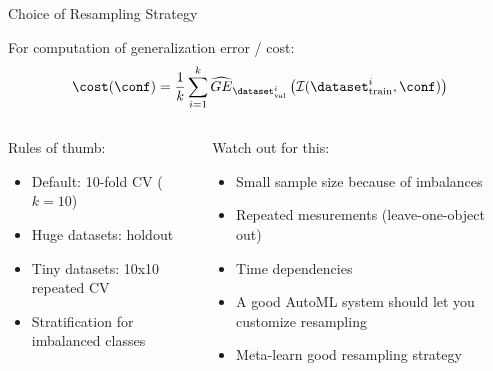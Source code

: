 	  \begin{frame}{Choice of Resampling Strategy}
		
		For computation of generalization error / cost:
		\begin{equation*}
		  \cost(\conf) = \frac{1}{k}\sum_{i = 1}^k \widehat{GE}_{\dataset_{\text{val}}^i}\left(\inducer(\dataset_{\text{train}}^i, \conf)\right)
		\end{equation*}
	  
		\vspace{1em}
		\begin{columns}
		  \begin{column}{0.5\textwidth}
		  Rules of thumb:
		  \begin{itemize}
			\item Default: 10-fold CV ($k=10$)
			\item Huge datasets: holdout
			\item Tiny datasets: 10x10 repeated CV
			\item Stratification for imbalanced classes
		  \end{itemize}
		  \end{column}
		  
		  \begin{column}{0.5\textwidth}
	   Watch out for this:       
		  \begin{itemize}
			\item Small sample size because of imbalances    
			\item Repeated mesurements (leave-one-object out)
			\item Time dependencies
			\item A good AutoML system should let you customize resampling
			\item Meta-learn good resampling strategy~
		  \end{itemize}
		  \end{column}
		  \end{columns}
		  
	  \end{frame}
	  
